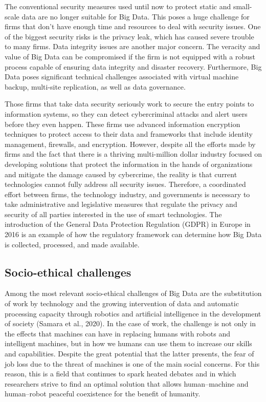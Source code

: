 \documentclass[
  letterpaper,
  DIV=11,
  numbers=noendperiod]{scrreprt}
\begin{document}
The conventional security measures used until now to protect static and
small-scale data are no longer suitable for Big Data. This poses a huge
challenge for firms that don't have enough time and resources to deal
with security issues. One of the biggest security risks is the privacy
leak, which has caused severe trouble to many firms. Data integrity
issues are another major concern. The veracity and value of Big Data can
be compromised if the firm is not equipped with a robust process capable
of ensuring data integrity and disaster recovery. Furthermore, Big Data
poses significant technical challenges associated with virtual machine
backup, multi-site replication, as well as data governance.

Those firms that take data security seriously work to secure the entry
points to information systems, so they can detect cybercriminal attacks
and alert users before they even happen. These firms use advanced
information encryption techniques to protect access to their data and
frameworks that include identity management, firewalls, and encryption.
However, despite all the efforts made by firms and the fact that there
is a thriving multi-million dollar industry focused on developing
solutions that protect the information in the hands of organizations and
mitigate the damage caused by cybercrime, the reality is that current
technologies cannot fully address all security issues. Therefore, a
coordinated effort between firms, the technology industry, and
governments is necessary to take administrative and legislative measures
that regulate the privacy and security of all parties interested in the
use of smart technologies. The introduction of the General Data
Protection Regulation (GDPR) in Europe in 2016 is an example of how the
regulatory framework can determine how Big Data is collected, processed,
and made available.

\hypertarget{socio-ethical-challenges}{%
\subsection{Socio-ethical challenges}\label{socio-ethical-challenges}}

Among the most relevant socio-ethical challenges of Big Data are the
substitution of work by technology and the growing intervention of data
and automatic processing capacity through robotics and artificial
intelligence in the development of society (Samara et al., 2020). In the
case of work, the challenge is not only in the effects that machines can
have in replacing humans with robots and intelligent machines, but in
how we humans can use them to increase our skills and capabilities.
Despite the great potential that the latter presents, the fear of job
loss due to the threat of machines is one of the main social concerns.
For this reason, this is a field that continues to spark heated debates
and in which researchers strive to find an optimal solution that allows
human--machine and human--robot peaceful coexistence for the benefit of
humanity.
\end{document}
